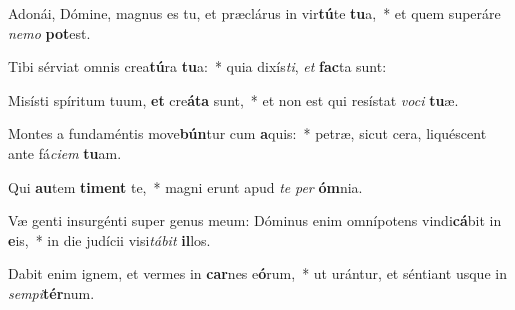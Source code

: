 \item Adonái, Dómine, magnus es tu, et præclárus in vir\textbf{tú}te \textbf{tu}a,~* et quem superáre \textit{ne}\textit{mo} \textbf{pot}est.
\item Tibi sérviat omnis crea\textbf{tú}ra \textbf{tu}a:~* quia dixís\textit{ti}, \textit{et} \textbf{fac}ta sunt:
\item Misísti spíritum tuum, \textbf{et} cre\textbf{á}\textbf{ta} sunt,~* et non est qui resístat \textit{vo}\textit{ci} \textbf{tu}æ.
\item Montes a fundaméntis move\textbf{bún}tur cum \textbf{a}quis:~* petræ, sicut cera, liquéscent ante fá\textit{ci}\textit{em} \textbf{tu}am.
\item Qui \textbf{au}tem \textbf{ti}\textbf{ment} te,~* magni erunt apud \textit{te} \textit{per} \textbf{óm}nia.
\item Væ genti insurgénti super genus meum: Dóminus enim omnípotens vindi\textbf{cá}bit in \textbf{e}is,~* in die judícii visi\textit{tá}\textit{bit} \textbf{il}los.
\item Dabit enim ignem, et vermes in \textbf{car}nes e\textbf{ó}rum,~* ut urántur, et séntiant usque in \textit{sem}\textit{pi}\textbf{tér}num.
